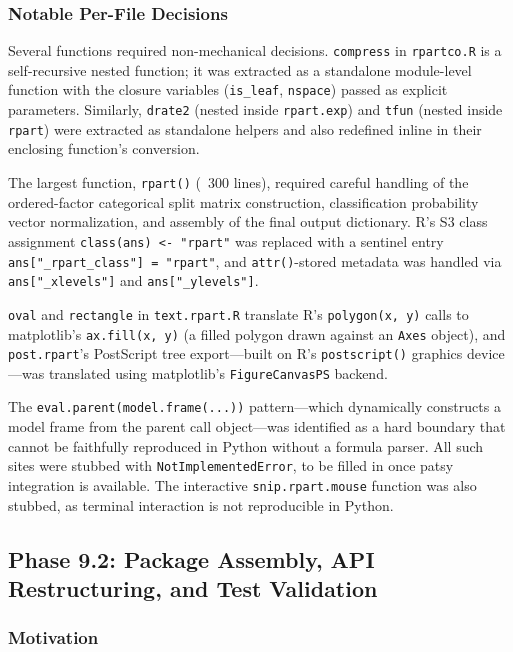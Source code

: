 \documentclass[12pt]{article}
\begin{document}
\subsubsection{Notable Per-File Decisions}

Several functions required non-mechanical decisions. \texttt{compress} in \texttt{rpartco.R} is a self-recursive nested function; it was extracted as a standalone module-level function with the closure variables (\texttt{is\_leaf}, \texttt{nspace}) passed as explicit parameters. Similarly, \texttt{drate2} (nested inside \texttt{rpart.exp}) and \texttt{tfun} (nested inside \texttt{rpart}) were extracted as standalone helpers and also redefined inline in their enclosing function's conversion.

The largest function, \texttt{rpart()} (~300 lines), required careful handling of the ordered-factor categorical split matrix construction, classification probability vector normalization, and assembly of the final output dictionary. R's S3 class assignment \texttt{class(ans) <- "rpart"} was replaced with a sentinel entry \texttt{ans["\_rpart\_class"] = "rpart"}, and \texttt{attr()}-stored metadata was handled via \texttt{ans["\_xlevels"]} and \texttt{ans["\_ylevels"]}.

\texttt{oval} and \texttt{rectangle} in \texttt{text.rpart.R} translate R's \texttt{polygon(x, y)} calls to matplotlib's \texttt{ax.fill(x, y)} (a filled polygon drawn against an \texttt{Axes} object), and \texttt{post.rpart}'s PostScript tree export---built on R's \texttt{postscript()} graphics device---was translated using matplotlib's \texttt{FigureCanvasPS} backend.

The \texttt{eval.parent(model.frame(...))} pattern---which dynamically constructs a model frame from the parent call object---was identified as a hard boundary that cannot be faithfully reproduced in Python without a formula parser. All such sites were stubbed with \texttt{NotImplementedError}, to be filled in once patsy integration is available. The interactive \texttt{snip.rpart.mouse} function was also stubbed, as terminal interaction is not reproducible in Python.

\subsection{Phase 9.2: Package Assembly, API Restructuring, and Test Validation}
\label{sec:phase9.2}

\subsubsection{Motivation}
\end{document}
